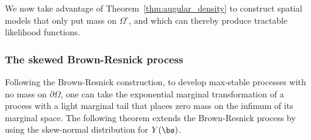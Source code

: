 \documentclass[12pt]{article}
\begin{document}
We now take advantage of Theorem~\ref{thm:augular_density} to construct spatial models that only put mass on $\Omega^\circ$, and which can thereby produce tractable likelihood functions. 

\subsubsection{The skewed Brown-Resnick process}

Following the Brown-Resnick construction, to develop max-stable processes with no mass on $\partial\Omega$, one can take the exponential marginal transformation of a process with a light marginal tail that places zero mass on the infimum of its 
marginal 
space. 
The following theorem extends the Brown-Resnick process by 
using the skew-normal distribution for $Y(\bs)$.
\end{document}
